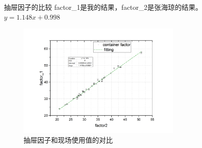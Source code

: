 \documentclass[11pt,compress,xcolor=x11names,UTF8]{beamer}
\begin{document}
\begin{frame}{抽屉因子的比较}
factor\_1是我的结果，factor\_2是张海琼的结果。$y=1.148x+0.998$
\vspace{-.05cm}
\begin{figure}
\includegraphics[width=0.72\textwidth]{drawerfactors}
\caption{抽屉因子和现场使用值的对比}
\end{figure}
\end{frame}
\end{document}
